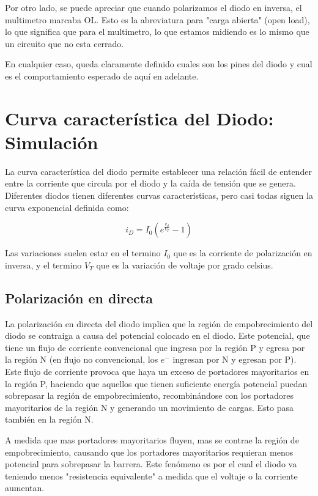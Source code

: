 \documentclass[chaptersright]{informeutn}
\begin{document}
    Por otro lado, se puede apreciar que cuando polarizamos el diodo en inversa, el multimetro marcaba OL. Esto es la
    abreviatura para "carga abierta" (open load), lo que significa que para el multimetro, lo que estamos midiendo es
    lo mismo que un circuito que no esta cerrado.

    En cualquier caso, queda claramente definido cuales son los pines del diodo y cual es el comportamiento esperado
    de aquí en adelante.


  \chapter{Curva característica del Diodo: Simulación}
    La curva característica del diodo permite establecer una relación fácil de entender entre la corriente que circula
    por el diodo y la caída de tensión que se genera. Diferentes diodos tienen diferentes curvas características, pero
    casi todas siguen la curva exponencial definida como:

    \begin{equation}
      i_D = I_0 \left(e^{\frac{v_d}{V_T}} - 1 \right)
      \label{eq.caracteristica}
    \end{equation}

    Las variaciones suelen estar en el termino $I_0$ que es la corriente de polarización en inversa, y el termino $V_T$
    que es la variación de voltaje por grado celsius.

    \section{Polarización en directa}
      La polarización en directa del diodo implica que la región de empobrecimiento del diodo se contraiga a causa del
      potencial colocado en el diodo. Este potencial, que tiene un flujo de corriente convencional que ingresa por la
      región P y egresa por la región N (en flujo no convencional, los $e^-$ ingresan por N y egresan por P). Este
      flujo de corriente provoca que haya un exceso de portadores mayoritarios en la región P, haciendo que aquellos
      que tienen suficiente energía potencial puedan sobrepasar la región de empobrecimiento, recombinándose con los
      portadores mayoritarios de la región N y generando un movimiento de cargas. Esto pasa también en la región N.

      A medida que mas portadores mayoritarios fluyen, mas se contrae la región de empobrecimiento, causando que los
      portadores mayoritarios requieran menos potencial para sobrepasar la barrera. Este fenómeno es por el cual el
      diodo va teniendo menos "resistencia equivalente" a medida que el voltaje o la corriente aumentan.
\end{document}
